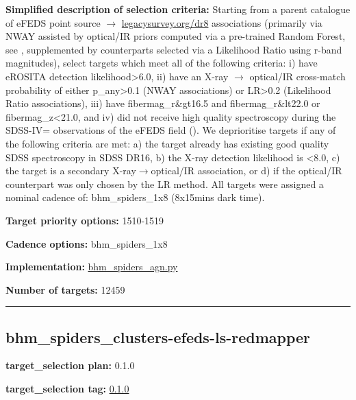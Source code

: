 \noindent\textbf{Simplified description of selection criteria:} Starting from a
parent catalogue of eFEDS point source $\rightarrow$
\href{https://www.legacysurvey.org/dr8}{legacysurvey.org/dr8}
associations (primarily via NWAY assisted by optical/IR priors computed
via a pre-trained Random Forest, see
\citealt{Salvato2022}, supplemented by counterparts selected via a Likelihood
Ratio using r-band magnitudes), select targets which meet all of the
following criteria: i) have eROSITA detection
likelihood\textgreater{}6.0, ii) have an X-ray $\rightarrow$ optical/IR cross-match
probability of either p\_any\textgreater{}0.1 (NWAY associations) or
LR\textgreater{}0.2 (Likelihood Ratio associations), iii) have
fibermag\_r\&gt16.5 and fibermag\_r\&lt22.0 or
fibermag\_z\textless{}21.0, and iv) did not receive high quality
spectroscopy during the SDSS-IV= observations of the eFEDS field
(\citealt{Abdurrouf_2021_sdssDR17}). We deprioritise targets if any of the following criteria
are met: a) the target already has existing good quality SDSS
spectroscopy in SDSS DR16, b) the X-ray detection likelihood is
\textless{}8.0, c) the target is a secondary X-ray$\rightarrow$optical/IR
association, or d) if the optical/IR counterpart was only chosen by the
LR method. All targets were assigned a nominal cadence of:
bhm\_spiders\_1x8 (8x15mins dark time).


\noindent\textbf{Target priority options:} 1510-1519

\noindent\textbf{Cadence options:} bhm\_spiders\_1x8

\noindent\textbf{Implementation:}
\href{https://github.com/sdss/target_selection/blob/0.1.0/python/target_selection/cartons/bhm_spiders_agn.py}{bhm\_spiders\_agn.py}

\noindent\textbf{Number of targets:} 12459

\begin{center}\rule{0.5\linewidth}{0.5pt}\end{center}

\hypertarget{bhm_spiders_clusters-efeds-ls-redmapper_plan0.1.0}{%
\subsection{bhm\_spiders\_clusters-efeds-ls-redmapper}\label{bhm_spiders_clusters-efeds-ls-redmapper_plan0.1.0}}

\noindent\textbf{target\_selection plan:} 0.1.0

\noindent\textbf{target\_selection tag:}
\href{https://github.com/sdss/target_selection/tree/0.1.0/}{0.1.0}

